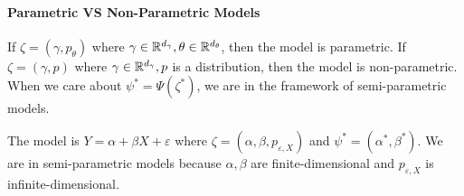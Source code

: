 \paragraph{Parametric VS Non-Parametric Models}
If $\zeta=(\gamma,p_\theta)$ where $\gamma \in \mathbb{R}^{d_\gamma}, \theta \in \mathbb{R}^{d_\theta}$, then the model is parametric. If $\zeta=(\gamma,p)$ where $\gamma \in \mathbb{R}^{d_\gamma}, p$ is a distribution, then the model is non-parametric. When we care about $\psi^*=\Psi(\zeta^*)$, we are in the framework of semi-parametric models.
\begin{example}
    The model is $Y=\alpha+\beta X+\varepsilon$ where $\zeta=(\alpha,\beta,p_{\varepsilon,X})$ and $\psi^*=(\alpha^*,\beta^*)$. We are in semi-parametric models because $\alpha,\beta$ are finite-dimensional and $p_{\varepsilon,X}$ is infinite-dimensional.
\end{example}

